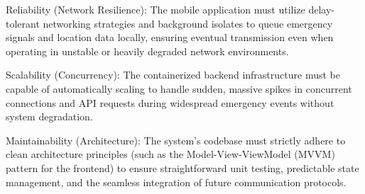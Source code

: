 \documentclass[../Main.tex]{subfiles}
\begin{document}
Reliability (Network Resilience): The mobile application must utilize delay-tolerant networking strategies and background isolates to queue emergency signals and location data locally, ensuring eventual transmission even when operating in unstable or heavily degraded network environments.

Scalability (Concurrency): The containerized backend infrastructure must be capable of automatically scaling to handle sudden, massive spikes in concurrent connections and API requests during widespread emergency events without system degradation.

Maintainability (Architecture): The system's codebase must strictly adhere to clean architecture principles (such as the Model-View-ViewModel (MVVM) pattern for the frontend) to ensure straightforward unit testing, predictable state management, and the seamless integration of future communication protocols.

\end{document}
